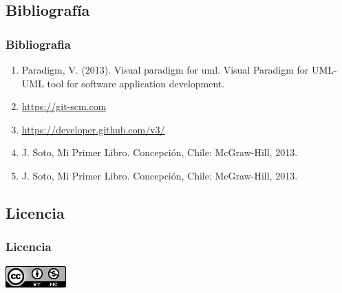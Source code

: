 \documentclass[8pt]{beamer}
\begin{document}
\subsection{Bibliografía}
\begin{frame}
\frametitle{Bibliografia}
	\begin{enumerate}
		\item Paradigm, V. (2013). Visual paradigm for uml. Visual Paradigm for UML-UML tool for software application development.
		\item \url{https://git-scm.com}
		\item \url{https://developer.github.com/v3/}
		\item J. Soto, Mi Primer Libro.  Concepción, Chile: McGraw-Hill, 2013.
		\item J. Soto, Mi Primer Libro.  Concepción, Chile: McGraw-Hill, 2013.
		
	\end{enumerate}
\end{frame}

\subsection{Licencia}
\begin{frame}
\frametitle{Licencia}
\begin{center}
\href{http://www.google.com}{\includegraphics[scale=.8]{cc}}
\end{center}
\end{frame}

\MuchasGraciasFrame
\end{document}
